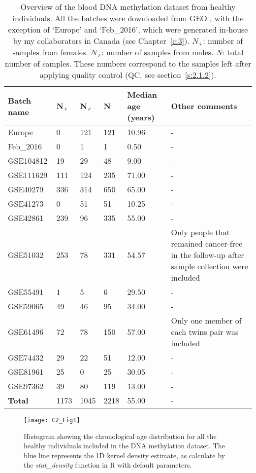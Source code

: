 \begin{table}
\small
	\begin{tabular}{ p{2cm} p{1cm} p{1cm} p{1cm} p{2cm} p{6cm} }
		\toprule
		\textbf{Batch name} & \textbf{N$_{\female}$} & \textbf{N$_{\male}$} & \textbf{N} & \textbf{Median age (years)} & \textbf{Other comments} \\
		\midrule
		Europe & 0 & 121 & 121 & 10.96 & - \\
		Feb\_2016 & 0 & 1 & 1 & 0.50 & - \\
		GSE104812 & 19 & 29 & 48 & 9.00 & - \\
		GSE111629 & 111 & 124 & 235 &  71.00 & - \\
		GSE40279 & 336 & 314 & 650 & 65.00 & - \\
		GSE41273 & 0 & 51 & 51 & 10.25 & - \\
		GSE42861 & 239 & 96 & 335 & 55.00 & - \\
		GSE51032 & 253 & 78 & 331 & 54.57 & Only people that remained cancer-free in the follow-up after sample collection were included  \\
		GSE55491 & 1 & 5 & 6 & 29.50 & - \\
		GSE59065 & 49 & 46 & 95 & 34.00 & - \\
		GSE61496 & 72 & 78 & 150 & 57.00 & Only one member of each twins pair was included \\
		GSE74432 & 29 & 22 & 51 & 12.00 & - \\
		GSE81961 & 25 & 0 & 25 & 30.05 & - \\
		GSE97362 & 39 & 80 & 119 & 13.00 & - \\
		\midrule
		\textbf{Total} & 1173 & 1045 & 2218 & 55.00 & - \\ 
		\bottomrule
	\end{tabular}
	\vspace*{3mm}
	\caption[Overview of the blood DNA methylation dataset from healthy individuals]{Overview of the blood DNA methylation dataset from healthy individuals. All the batches were downloaded from GEO \cite{Edgar2002}, with the exception of `Europe' and `Feb\_2016', which were generated in-house by my collaborators in Canada (see Chapter~\ref{c:3}). $N_{\female}$: number of samples from females. $N_{\male}$: number of samples from males. $N$: total number of samples. These numbers correspond to the samples left after applying quality control (QC, see section~\ref{s:2.1.2}).}
	\label{table:c2_table1}
\end{table} 


\begin{figure}[htbp!] 
	\centering    
	\texttt{[image: C2\_Fig1]}
	\vspace*{2mm}
	\caption[Chronological age distribution in the healthy individuals]{Histogram showing the chronological age distribution for all the healthy individuals included in the DNA methylation dataset. The blue line represents the 1D kernel density estimate, as calculate by the \textit{stat\_density} function in R with default parameters.}
	\label{fig:c2_fig1}
\end{figure}

